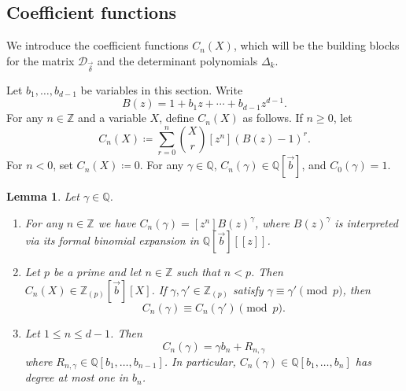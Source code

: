 \documentclass{amsart}
\theoremstyle{plain}
\newtheorem{lemma}[theorem]{Lemma}
\theoremstyle{remark}
\newcommand{\cD}{\mathcal{D}}
\newcommand{\1}{\mathbf{1}}
\newcommand{\Q}{\mathbb{Q}}
\newcommand{\Z}{\mathbb{Z}}
\newcommand{\vb}{{\vec{b}}}
\newcommand{\bdelta}{{\vec\delta}}
\begin{document}
\subsection{Coefficient functions}

We introduce the coefficient functions $C_n(X)$,
which will be the building blocks
for the matrix $\cD_\bdelta$ and the determinant polynomials $\Delta_k$.

Let $b_1,\ldots,b_{d-1}$ be variables in this section.
Write
\begin{equation}\label{E:B(z)}
B(z) =
1+b_1z+\cdots+b_{d-1}z^{d-1}.
\end{equation}
For any $n\in\Z$ and a variable $X$,
define $C_n(X)$ as follows.
If $n\ge 0$, let
\begin{equation}\label{E:C_n}
\boxed{C_n(X)
\coloneqq \sum_{r=0}^n
\binom{X}{r}[z^n](B(z)-1)^r.}
\end{equation}
For $n<0$, set
$C_n(X)\coloneqq 0$.
For any $\gamma\in\Q$, $C_n(\gamma)\in \Q[\vb]$,
and $C_0(\gamma)=1$.


\begin{lemma}\label{L:C_n}
Let $\gamma\in\Q$.
\begin{enumerate}
\item For any $n\in\Z$ we have
$C_n(\gamma)=[z^n]B(z)^\gamma$, where $B(z)^\gamma$ is interpreted
via its formal binomial expansion in $\Q[\vb][[z]]$.
\item Let $p$ be a prime and let $n\in\Z$ such that $n<p$.
Then $C_n(X)\in\Z_{(p)}[\vb][X]$.
If $\gamma,\gamma'\in\Z_{(p)}$ satisfy $\gamma\equiv \gamma'\pmod p$,
then
\[
C_n(\gamma)\equiv C_n(\gamma') \pmod p.
\]
\item Let $1\le n\le d-1$. Then
\[
C_n(\gamma)=\gamma b_n+R_{n,\gamma}
\]
where $R_{n,\gamma}\in\Q[b_1,\ldots,b_{n-1}]$.
In particular, $C_n(\gamma)\in\Q[b_1,\ldots,b_n]$ has degree at most one in $b_n$.
\end{enumerate}
\end{lemma}
\end{document}
